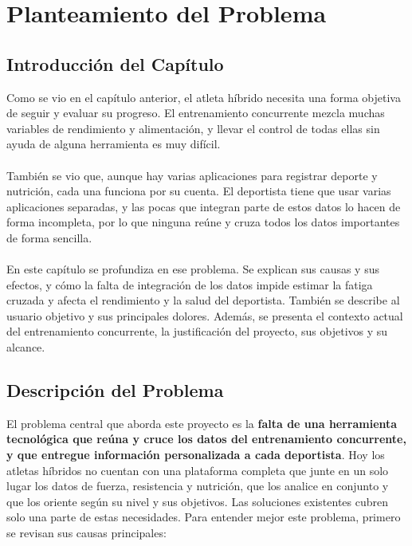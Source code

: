 \section{Planteamiento del Problema}
\subsection{Introducción del Capítulo}
Como se vio en el capítulo anterior, el atleta híbrido necesita una forma objetiva de seguir y evaluar su progreso. El entrenamiento concurrente mezcla muchas variables de rendimiento y alimentación, y llevar el control de todas ellas sin ayuda de alguna herramienta es muy difícil.
\\\\
También se vio que, aunque hay varias aplicaciones para registrar deporte y nutrición, cada una funciona por su cuenta. El deportista tiene que usar varias aplicaciones separadas, y las pocas que integran parte de estos datos lo hacen de forma incompleta, por lo que ninguna reúne y cruza todos los datos importantes de forma sencilla.
\\\\
En este capítulo se profundiza en ese problema. Se explican sus causas y sus efectos, y cómo la falta de integración de los datos impide estimar la fatiga cruzada y afecta el rendimiento y la salud del deportista. También se describe al usuario objetivo y sus principales dolores. Además, se presenta el contexto actual del entrenamiento concurrente, la justificación del proyecto, sus objetivos y su alcance.
\subsection{Descripción del Problema}

El problema central que aborda este proyecto es la \textbf{falta de una herramienta tecnológica que reúna y cruce los datos del entrenamiento concurrente, y que entregue información personalizada a cada deportista}. Hoy los atletas híbridos no cuentan con una plataforma completa que junte en un solo lugar los datos de fuerza, resistencia y nutrición, que los analice en conjunto y que los oriente según su nivel y sus objetivos. Las soluciones existentes cubren solo una parte de estas necesidades.
\newpage
Para entender mejor este problema, primero se revisan sus causas principales:

